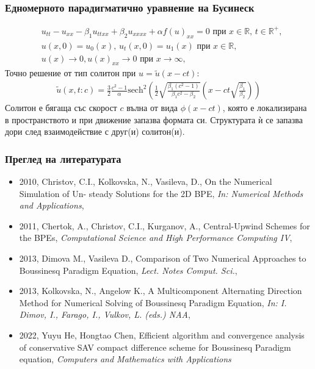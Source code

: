 \documentclass{beamer}
\newcommand{\RR}{\mathbb{R}}
\begin{document}
\begin{frame}
\frametitle{ Едномерното парадигматично уравнение на Бусинеск }
\begin{align}
&u_{tt} - u_{xx} -\beta_1  u_{ttxx} +\beta_2 u_{xxxx} + \alpha f(u)_{xx}=0   \text{ при } x \in \RR, \, t\in\RR^+,\label{eq1D}
\\ \nonumber &u(x,0)=u_0(x), \, u_t(x,0)=u_1(x)   \text{ при } x \in \RR,
\\  &u(x) \rightarrow 0,  u(x)_{xx} \rightarrow 0  \text{ при } x \rightarrow \infty, \label{eq1d1}
\end{align}
Точно решение от тип солитон при $u =\tilde u(x-ct)$:
\begin{align}
\tilde u(x,t:c) = \frac{3}{2} \frac{c^2-1}{\alpha}\text{sech}^2 \left( \frac{1}{2}  \sqrt{ \frac{\beta_1 (c^2-1)}{\beta_1 c^2-\beta_2}} (x-c t \sqrt{\frac{\beta_1}{\beta_2}} ) \right)
\end{align}
Солитон е бягаща със скорост $c$ вълна от вида $\phi(x-ct)$, която е локализирана в пространството и при движение запазва формата си. Структурата ѝ се запазва дори след взаимодействие с друг(и) солитон(и).
\end{frame}



\begin{frame}
\frametitle{Преглед на литературата}

\begin{itemize}
  \item 2010, Christov, C.I., Kolkovska, N., Vasileva, D., On the Numerical Simulation of Un-
steady Solutions for the 2D BPE, {\it In: Numerical Methods and Applications},

  \item 2011, Chertok, A., Christov, C.I., Kurganov, A., Central-Upwind Schemes for the BPEs,
{\it Computational Science and High Performance Computing IV},

  \item 2013, Dimova M., Vasileva D., Comparison of Two Numerical Approaches to Boussinesq Paradigm Equation,  {\it Lect. Notes Comput. Sci.}, 

  \item 2013, Kolkovska, N., Angelow K., A Multicomponent Alternating Direction Method for Numerical Solving of Boussinesq Paradigm Equation, {\it In:  I. Dimov, I., Farago, I., Vulkov, L. (eds.) NAA},
    
  \item 2022, Yuyu He, Hongtao Chen, Efficient algorithm and convergence analysis of conservative SAV compact difference scheme for Boussinesq Paradigm equation, {\it Computers and Mathematics with Applications}
\end{itemize}

\end{frame}
\end{document}
